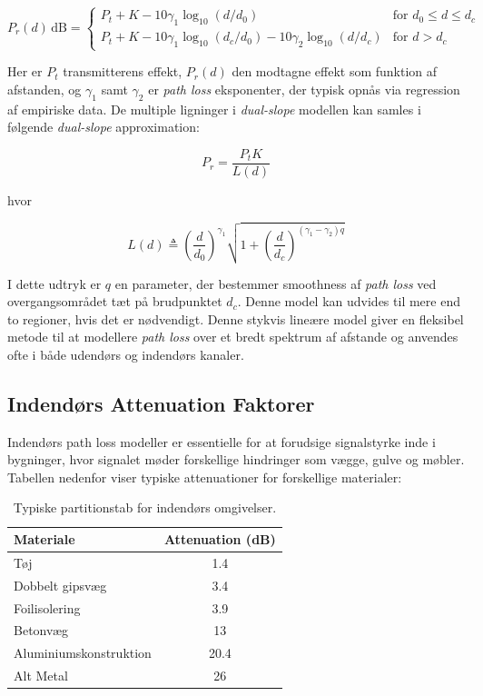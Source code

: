 \documentclass[a4paper,12pt]{book}
\begin{document}
	\[
	P_r(d) \, \text{dB} = 
	\begin{cases} 
		P_t + K - 10 \gamma_1 \log_{10}(d/d_0) & \text{for } d_0 \leq d \leq d_c \\
		P_t + K - 10 \gamma_1 \log_{10}(d_c/d_0) - 10 \gamma_2 \log_{10}(d/d_c) & \text{for } d > d_c 
	\end{cases}
	\]
	
	Her er \(P_t\) transmitterens effekt, \(P_r(d)\) den modtagne effekt som funktion af afstanden, og \(\gamma_1\) samt \(\gamma_2\) er \textit{path loss} eksponenter, der typisk opnås via regression af empiriske data.
	\newline\newline
	De multiple ligninger i \textit{dual-slope} modellen kan samles i følgende \textit{dual-slope} approximation:
	
	\[
	P_r = \frac{P_t K}{L(d)}
	\]
	
	hvor
	
	\[
	L(d) \triangleq \left(\frac{d}{d_0}\right)^{\gamma_1} \sqrt{1 + \left(\frac{d}{d_c}\right)^{(\gamma_1 - \gamma_2)q}}
	\]
	
	I dette udtryk er \(q\) en parameter, der bestemmer smoothness af \textit{path loss} ved overgangsområdet tæt på brudpunktet \(d_c\). Denne model kan udvides til mere end to regioner, hvis det er nødvendigt.
	\newline\newline
	Denne stykvis lineære model giver en fleksibel metode til at modellere \textit{path loss} over et bredt spektrum af afstande og anvendes ofte i både udendørs og indendørs kanaler.
	
	
	\subsection{Indendørs Attenuation Faktorer}
	Indendørs path loss modeller er essentielle for at forudsige signalstyrke inde i bygninger, hvor signalet møder forskellige hindringer som vægge, gulve og møbler. Tabellen nedenfor viser typiske attenuationer for forskellige materialer:
	
	\begin{table}[h]
		\centering
		\begin{tabular}{|l|c|}
			\hline
			\textbf{Materiale} & \textbf{Attenuation (dB)} \\
			\hline
			Tøj & 1.4 \\
			Dobbelt gipsvæg & 3.4 \\
			Foilisolering & 3.9 \\
			Betonvæg & 13 \\
			Aluminiumskonstruktion & 20.4 \\
			Alt Metal & 26 \\
			\hline
		\end{tabular}
		\caption{Typiske partitionstab for indendørs omgivelser.}
	\end{table}
	
\end{document}
